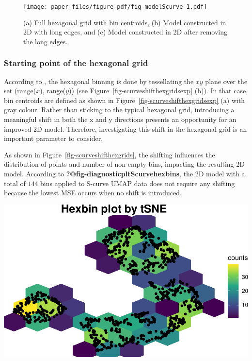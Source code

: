 \documentclass[
  12pt]{article}
\begin{document}
\begin{figure}[H]

{\centering \texttt{[image: paper\_files/figure-pdf/fig-modelScurve-1.pdf]}

}

\caption{\label{fig-modelScurve}(a) Full hexagonal grid with bin
centroids, (b) Model constructed in 2D with long edges, and (c) Model
constructed in 2D after removing the long edges.}

\end{figure}

\hypertarget{starting-point-of-the-hexagonal-grid}{%
\subsubsection{Starting point of the hexagonal
grid}\label{starting-point-of-the-hexagonal-grid}}

According to \citet{Dan2023}, the hexagonal binning is done by
tessellating the \(xy\) plane over the set (range(\(x\)), range(\(y\)))
(see Figure~\ref{fig-scurveshifthexgridsexp} (b)). In that case, bin
centroids are defined as shown in
Figure~\ref{fig-scurveshifthexgridsexp} (a) with gray colour. Rather
than sticking to the typical hexagonal grid, introducing a meaningful
shift in both the x and y directions presents an opportunity for an
improved 2D model. Therefore, investigating this shift in the hexagonal
grid is an important parameter to consider.

As shown in Figure~\ref{fig-scurveshifthexgrids}, the shifting
influences the distribution of points and number of non-empty bins,
impacting the resulting 2D model. According to
\textbf{?@fig-diagnosticpltScurvehexbins}, the 2D model with a total of
\(144\) bins applied to S-curve UMAP data does not require any shifting
because the lowest MSE occurs when no shift is introduced.

\includegraphics{paper_files/figure-pdf/unnamed-chunk-36-1.pdf}
\end{document}
